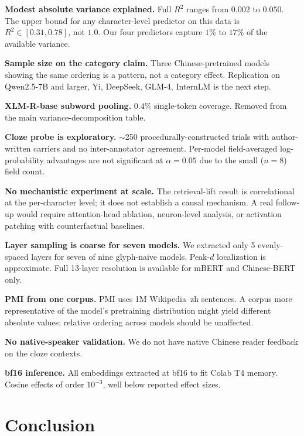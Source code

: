 \documentclass[11pt,a4paper,twocolumn]{article}
\begin{document}
\noindent\textbf{Modest absolute variance explained.}
Full $R^2$ ranges from $0.002$ to $0.050$. The upper bound for any
character-level predictor on this data is $R^2 \in [0.31, 0.78]$, not
$1.0$. Our four predictors capture $1\%$ to $17\%$ of the available
variance.

\noindent\textbf{Sample size on the category claim.}
Three Chinese-pretrained models showing the same ordering is a
pattern, not a category effect. Replication on Qwen2.5-7B and larger,
Yi, DeepSeek, GLM-4, InternLM is the next step.

\noindent\textbf{XLM-R-base subword pooling.}
$0.4\%$ single-token coverage. Removed from the main
variance-decomposition table.

\noindent\textbf{Cloze probe is exploratory.}
$\sim$250 procedurally-constructed trials with author-written carriers
and no inter-annotator agreement. Per-model field-averaged
log-probability advantages are not significant at $\alpha = 0.05$ due
to the small ($n = 8$) field count.

\noindent\textbf{No mechanistic experiment at scale.}
The retrieval-lift result is correlational at the per-character
level; it does not establish a causal mechanism. A real follow-up
would require attention-head ablation, neuron-level analysis, or
activation patching with counterfactual baselines.

\noindent\textbf{Layer sampling is coarse for seven models.}
We extracted only 5 evenly-spaced layers for seven of nine glyph-naive
models. Peak-$d$ localization is approximate. Full 13-layer resolution
is available for mBERT and Chinese-BERT only.

\noindent\textbf{PMI from one corpus.}
PMI uses 1M Wikipedia~zh sentences. A corpus more representative of
the model's pretraining distribution might yield different absolute
values; relative ordering across models should be unaffected.

\noindent\textbf{No native-speaker validation.}
We do not have native Chinese reader feedback on the cloze contexts.

\noindent\textbf{bf16 inference.}
All embeddings extracted at bf16 to fit Colab T4 memory. Cosine
effects of order $10^{-3}$, well below reported effect sizes.

\section{Conclusion}
\end{document}
